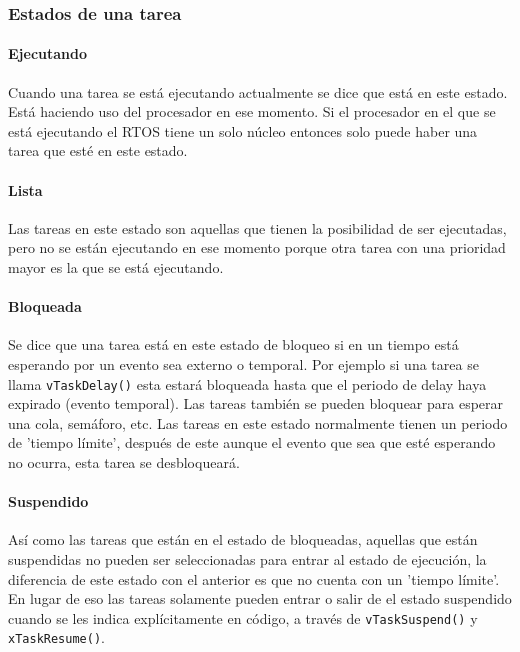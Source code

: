     \subsubsection{Estados de una tarea}
    
    \paragraph{Ejecutando}
    
    Cuando una tarea se está ejecutando actualmente se dice que está en este estado. Está haciendo uso del procesador en ese momento. Si el procesador en el que se está ejecutando el RTOS tiene un solo núcleo entonces solo puede haber una tarea que esté en este estado.
    
    \paragraph{Lista}
    
    Las tareas en este estado son aquellas que tienen la posibilidad de ser ejecutadas, pero no se están ejecutando en ese momento porque otra tarea con una prioridad mayor es la que se está ejecutando. 
    
    \paragraph{Bloqueada}
    
    Se dice que una tarea está en este estado de bloqueo si en un tiempo está esperando por un evento sea externo o temporal. Por ejemplo si una tarea se llama \texttt{vTaskDelay()} esta estará bloqueada hasta que el periodo de delay haya expirado (evento temporal). Las tareas también se pueden bloquear para esperar una cola, semáforo, etc. Las tareas en este estado normalmente tienen un periodo de 'tiempo límite', después de este aunque el evento que sea que esté esperando no ocurra, esta tarea se desbloqueará.
    
    \paragraph{Suspendido}
    
    Así como las tareas que están en el estado de bloqueadas, aquellas que están suspendidas no pueden ser seleccionadas para entrar al estado de ejecución, la diferencia de este estado con el anterior es que no cuenta con un 'tiempo límite'. En lugar de eso las tareas solamente pueden entrar o salir de el estado suspendido cuando se les indica explícitamente en código, a través de \texttt{vTaskSuspend()} y \texttt{xTaskResume()}.
    
